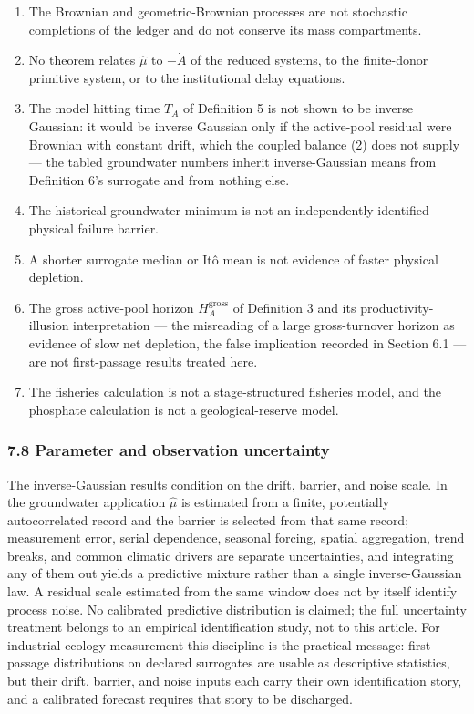 \documentclass[11pt]{article}
\providecommand{\tightlist}{\setlength{\itemsep}{0pt}\setlength{\parskip}{0pt}}
\begin{document}
\begin{enumerate}
\def\labelenumi{\arabic{enumi}.}
\tightlist
\item
  The Brownian and geometric-Brownian processes are not stochastic
  completions of the ledger and do not conserve its mass compartments.
\item
  No theorem relates \(\widehat\mu\) to \(-\dot A\) of the reduced
  systems, to the finite-donor primitive system, or to the institutional
  delay equations.
\item
  The model hitting time \(T_A\) of Definition 5 is not shown to be
  inverse Gaussian: it would be inverse Gaussian only if the active-pool
  residual were Brownian with constant drift, which the coupled balance
  (2) does not supply --- the tabled groundwater numbers inherit
  inverse-Gaussian means from Definition 6's surrogate and from nothing
  else.
\item
  The historical groundwater minimum is not an independently identified
  physical failure barrier.
\item
  A shorter surrogate median or It\^o mean is not evidence of faster
  physical depletion.
\item
  The gross active-pool horizon \(H_A^{\mathrm{gross}}\) of Definition 3
  and its productivity-illusion interpretation --- the misreading of a
  large gross-turnover horizon as evidence of slow net depletion, the
  false implication recorded in Section 6.1 --- are not first-passage
  results treated here.
\item
  The fisheries calculation is not a stage-structured fisheries model,
  and the phosphate calculation is not a geological-reserve model.
\end{enumerate}

\subsubsection{7.8 Parameter and observation
uncertainty}\label{parameter-and-observation-uncertainty}

The inverse-Gaussian results condition on the drift, barrier, and noise
scale. In the groundwater application \(\widehat\mu\) is estimated from
a finite, potentially autocorrelated record and the barrier is selected
from that same record; measurement error, serial dependence, seasonal
forcing, spatial aggregation, trend breaks, and common climatic drivers
are separate uncertainties, and integrating any of them out yields a
predictive mixture rather than a single inverse-Gaussian law. A residual
scale estimated from the same window does not by itself identify process
noise. No calibrated predictive distribution is claimed; the full
uncertainty treatment belongs to an empirical identification study, not
to this article. For industrial-ecology measurement this discipline is
the practical message: first-passage distributions on declared
surrogates are usable as descriptive statistics, but their drift,
barrier, and noise inputs each carry their own identification story, and
a calibrated forecast requires that story to be discharged.
\end{document}
